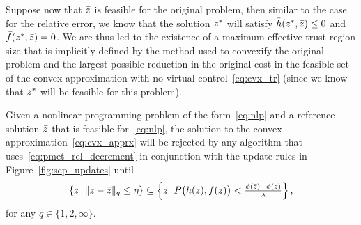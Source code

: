 \documentclass[letterpaper, 10 pt, conference]{ieeeconf}
\begin{document}
Suppose now that $\bar{z}$ is feasible for the original problem, then similar to the case for the relative error, we know that the solution $z^*$ will satisfy $\bar{h}(z^*,\bar{z})\leq 0$ and $\bar{f}(z^*,\bar{z})=0$. We are thus led to the existence of a maximum effective trust region size that is implicitly defined by the method used to convexify the original problem and the largest possible reduction in the original cost in the feasible set of the convex approximation with no virtual control~\eqref{eq:cvx_tr} (since we know that $z^*$ will be feasible for this problem). 

\begin{lemma}
Given a nonlinear programming problem of the form~\eqref{eq:nlp} and a reference solution $\bar{z}$ that is feasible for~\eqref{eq:nlp}, the solution to the convex approximation~\eqref{eq:cvx_apprx} will be rejected by any algorithm that uses~\eqref{eq:pmet_rel_decrement} in conjunction with the update rules in Figure~\ref{fig:scp_updates} until
\begin{equation}
\left\{ z\,|\,\|z-\bar{z}\|_q \leq \eta \right\} \subseteq \left\{ z\,|\, P\big(h(z),f(z)\big) < \tfrac{\phi(\bar{z})-\phi(z)}{\lambda} \right\},
\end{equation}
for any $q\in\{1,2,\infty\}$. 
\end{lemma}

\end{document}

